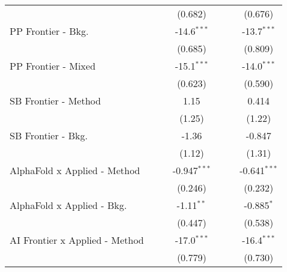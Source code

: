 \begin{tabular}{lcccccc}
                                  &               &               & (0.682)        &                &                & (0.676)\\   
   PP Frontier - Bkg.             &               &               & -14.6$^{***}$  &                &                & -13.7$^{***}$\\   
                                  &               &               & (0.685)        &                &                & (0.809)\\   
   PP Frontier - Mixed            &               &               & -15.1$^{***}$  &                &                & -14.0$^{***}$\\   
                                  &               &               & (0.623)        &                &                & (0.590)\\   
   SB Frontier - Method           &               &               & 1.15           &                &                & 0.414\\   
                                  &               &               & (1.25)         &                &                & (1.22)\\   
   SB Frontier - Bkg.             &               &               & -1.36          &                &                & -0.847\\   
                                  &               &               & (1.12)         &                &                & (1.31)\\   
   AlphaFold x Applied - Method   &               &               & -0.947$^{***}$ &                &                & -0.641$^{***}$\\   
                                  &               &               & (0.246)        &                &                & (0.232)\\   
   AlphaFold x Applied - Bkg.     &               &               & -1.11$^{**}$   &                &                & -0.885$^{*}$\\   
                                  &               &               & (0.447)        &                &                & (0.538)\\   
   AI Frontier x Applied - Method &               &               & -17.0$^{***}$  &                &                & -16.4$^{***}$\\   
                                  &               &               & (0.779)        &                &                & (0.730)\\   

\end{tabular}
